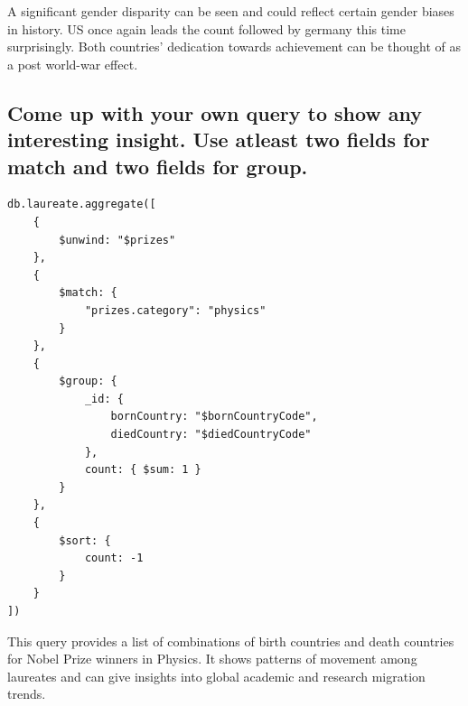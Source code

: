 \documentclass{article}
\begin{document}
A significant gender disparity can be seen and could reflect certain gender biases in history. US once again leads the count followed by germany this time surprisingly. Both countries' dedication towards achievement can be thought of as a post world-war effect.

\subsection{Come up with your own query to show any interesting insight. Use atleast two fields for match and two fields for group.}
\begin{lstlisting}
db.laureate.aggregate([
    {
        $unwind: "$prizes"
    },
    {
        $match: {
            "prizes.category": "physics"
        }
    },
    {
        $group: {
            _id: {
                bornCountry: "$bornCountryCode",
                diedCountry: "$diedCountryCode"
            },
            count: { $sum: 1 }
        }
    },
    {
        $sort: {
            count: -1
        }
    }
])
\end{lstlisting}
This query provides a list of combinations of birth countries and death countries for Nobel Prize winners in Physics. It shows patterns of movement among laureates and can give insights into global academic and research migration trends.
\end{document}
